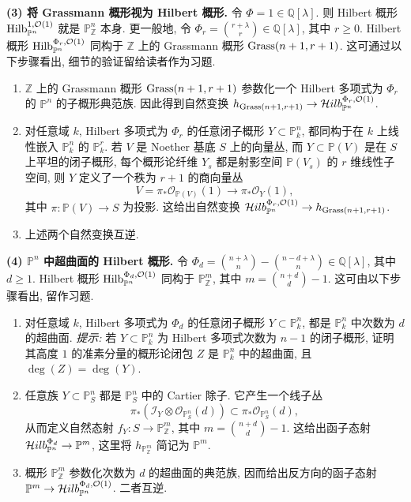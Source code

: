 \textbf{(3) 将 Grassmann 概形视为 Hilbert 概形.}
令 $\Phi=1\in\mathbb Q[\lambda]$. 则 Hilbert 概形 $\operatorname{Hilb}^{1,\mathcal O(1)}_{\mathbb P^n}$ 就是 $\mathbb P^n_{\mathbb Z}$ 本身. 更一般地, 令 $\Phi_r=\binom{r+\lambda}{r}\in\mathbb Q[\lambda]$, 其中 $r\geq0$. Hilbert 概形 $\operatorname{Hilb}^{\Phi_r,\mathcal O(1)}_{\mathbb P^n}$ 同构于 $\mathbb Z$ 上的 Grassmann 概形 $\operatorname{Grass}(n+1,r+1)$. 这可通过以下步骤看出, 细节的验证留给读者作为习题.
\begin{enumerate}
\item[(i)] $\mathbb Z$ 上的 Grassmann 概形 $\operatorname{Grass}(n+1,r+1)$ 参数化一个 Hilbert 多项式为 $\Phi_r$ 的 $\mathbb P^n$ 的子概形典范族. 因此得到自然变换 $h_{\operatorname{Grass}(n+1,r+1)}\to\mathcal{H}ilb^{\Phi_r,\mathcal O(1)}_{\mathbb P^n}$.
\item[(ii)] 对任意域 $k$, Hilbert 多项式为 $\Phi_r$ 的任意闭子概形 $Y\subset\mathbb P^n_k$, 都同构于在 $k$ 上线性嵌入 $\mathbb P^n_k$ 的 $\mathbb P^r_k$. 若 $V$ 是 Noether 基底 $S$ 上的向量丛, 而 $Y\subset\mathbb P(V)$ 是在 $S$ 上平坦的闭子概形, 每个概形论纤维 $Y_s$ 都是射影空间 $\mathbb P(V_s)$ 的 $r$ 维线性子空间, 则 $Y$ 定义了一个秩为 $r+1$ 的商向量丛
\[
 V=\pi_*\mathcal O_{\mathbb P(V)}(1)\longrightarrow\pi_*\mathcal O_Y(1),
\]
其中 $\pi:\mathbb P(V)\to S$ 为投影. 这给出自然变换 $\mathcal{H}ilb^{\Phi_r,\mathcal O(1)}_{\mathbb P^n}\to h_{\operatorname{Grass}(n+1,r+1)}$.
\item[(iii)] 上述两个自然变换互逆.
\end{enumerate}

\textbf{(4) $\mathbb P^n$ 中超曲面的 Hilbert 概形.}
令 $\Phi_d=\binom{n+\lambda}{n}-\binom{n-d+\lambda}{n}\in\mathbb Q[\lambda]$, 其中 $d\geq1$. Hilbert 概形 $\operatorname{Hilb}^{\Phi_d,\mathcal O(1)}_{\mathbb P^n}$ 同构于 $\mathbb P^m_{\mathbb Z}$, 其中 $m=\binom{n+d}{d}-1$. 这可由以下步骤看出, 留作习题.
\begin{enumerate}
\item[(i)] 对任意域 $k$, Hilbert 多项式为 $\Phi_d$ 的任意闭子概形 $Y\subset\mathbb P^n_k$, 都是 $\mathbb P^n_k$ 中次数为 $d$ 的超曲面. \emph{提示:} 若 $Y\subset\mathbb P^n_k$ 为 Hilbert 多项式次数为 $n-1$ 的闭子概形, 证明其高度 $1$ 的准素分量的概形论闭包 $Z$ 是 $\mathbb P^n_k$ 中的超曲面, 且 $\deg(Z)=\deg(Y)$.
\item[(ii)] 任意族 $Y\subset\mathbb P^n_S$ 都是 $\mathbb P^n_S$ 中的 Cartier 除子. 它产生一个线子丛
\[
 \pi_*(\mathcal I_Y\otimes\mathcal O_{\mathbb P^n_S}(d))\subset\pi_*\mathcal O_{\mathbb P^n_S}(d),
\]
从而定义自然态射 $f_Y:S\to\mathbb P^m_{\mathbb Z}$, 其中 $m=\binom{n+d}{d}-1$. 这给出函子态射 $\mathcal{H}ilb^{\Phi_d}_{\mathbb P^n}\to\mathbb P^m$, 这里将 $h_{\mathbb P^m_{\mathbb Z}}$ 简记为 $\mathbb P^m$.
\item[(iii)] 概形 $\mathbb P^m_{\mathbb Z}$ 参数化次数为 $d$ 的超曲面的典范族, 因而给出反方向的函子态射 $\mathbb P^m\to\mathcal{H}ilb^{\Phi_d,\mathcal O(1)}_{\mathbb P^n}$. 二者互逆.
\end{enumerate}

